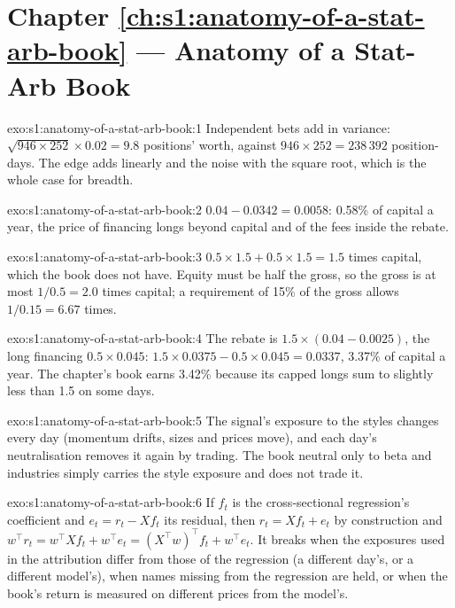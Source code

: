 \section*{Chapter \ref{ch:s1:anatomy-of-a-stat-arb-book} --- Anatomy of a Stat-Arb Book}

\begin{solution}{exo:s1:anatomy-of-a-stat-arb-book:1}
Independent bets add in variance: $\sqrt{946 \times 252} \times 0.02 = 9.8$ positions' worth, against $946 \times 252 = 238\,392$ position-days. The
edge adds linearly and the noise with the square root, which is the whole case for breadth.
\end{solution}

\begin{solution}{exo:s1:anatomy-of-a-stat-arb-book:2}
$0.04 - 0.0342 = 0.0058$: 0.58\% of capital a year, the price of financing longs beyond capital and of the fees inside the rebate.
\end{solution}

\begin{solution}{exo:s1:anatomy-of-a-stat-arb-book:3}
$0.5 \times 1.5 + 0.5 \times 1.5 = 1.5$ times capital, which the book does not have. Equity must be half the gross, so the gross is at most $1/0.5 = 2.0$ times
capital; a requirement of 15\% of the gross allows $1/0.15 = 6.67$ times.
\end{solution}

\begin{solution}{exo:s1:anatomy-of-a-stat-arb-book:4}
The rebate is $1.5 \times (0.04 - 0.0025)$, the long financing $0.5 \times 0.045$: $1.5 \times 0.0375 - 0.5 \times 0.045 = 0.0337$, 3.37\% of capital a
year. The chapter's book earns 3.42\% because its capped longs sum to slightly less than 1.5 on some days.
\end{solution}

\begin{solution}{exo:s1:anatomy-of-a-stat-arb-book:5}
The signal's exposure to the styles changes every day (momentum drifts, sizes and prices move), and each day's neutralisation removes it again by trading. The
book neutral only to beta and industries simply carries the style exposure and does not trade it.
\end{solution}

\begin{solution}{exo:s1:anatomy-of-a-stat-arb-book:6}
If $f_t$ is the cross-sectional regression's coefficient and $e_t = r_t - X f_t$ its residual, then $r_t = X f_t + e_t$ by construction and
$w^\top r_t = w^\top X f_t + w^\top e_t = (X^\top w)^\top f_t + w^\top e_t$. It breaks when the exposures used in the attribution differ from those of the
regression (a different day's, or a different model's), when names missing from the regression are held, or when the book's return is measured on different
prices from the model's.
\end{solution}

